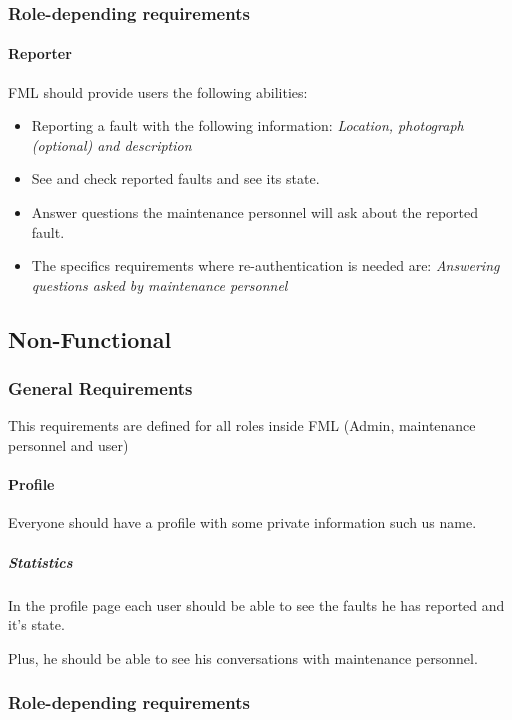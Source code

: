 \documentclass{report}
\begin{document}
\subsubsection{Role-depending requirements}

\paragraph{Reporter} FML should provide users the following abilities:
\begin{itemize}
\item Reporting a fault with the following information: \textit{Location, photograph (optional) and description}
\item See and check reported faults and see its state.
\item Answer questions the maintenance personnel will ask about the reported fault.
\item The specifics requirements where re-authentication is needed are: \textit{Answering questions asked by maintenance personnel}   \label{Specifics_Secure_Requirements_for_user}
\end{itemize}


\subsection{Non-Functional}

\subsubsection{General Requirements}

This requirements are defined for all roles inside FML (Admin, maintenance personnel and user)

\paragraph{Profile} Everyone should have a profile with some private information such us name.

\subparagraph{Statistics} In the profile page each user should be able to see the faults he has reported and it's state.

Plus, he should be able to see his conversations with maintenance personnel.


\subsubsection{Role-depending requirements}
\end{document}
